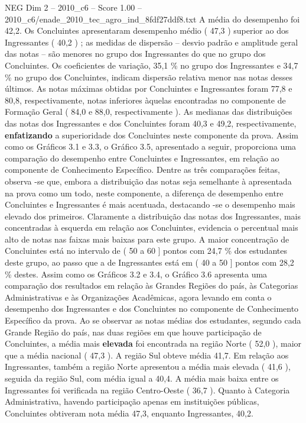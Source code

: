 \begin{textsample}{NEG Dim 2 – 2010\_c6 – Score 1.00 – 2010\_c6/enade\_2010\_tec\_agro\_ind\_8fdf27ddf8.txt}
A média do desempenho foi 42,2.
Os Concluintes apresentaram desempenho médio ( 47,3 ) superior ao dos Ingressantes ( 40,2 ) ; as medidas de dispersão – desvio padrão e amplitude geral das notas – são menores no grupo dos Ingressantes do que no grupo dos Concluintes.
Os coeficientes de variação, 35,1 \% no grupo dos Ingressantes e 34,7 \% no grupo dos Concluintes, indicam dispersão relativa menor nas notas desses últimos.
As notas máximas obtidas por Concluintes e Ingressantes foram 77,8 e 80,8, respectivamente, notas inferiores àquelas encontradas no componente de Formação Geral ( 84,0 e 88,0, respectivamente ).
As medianas das distribuições das notas dos Ingressantes e dos Concluintes foram 40,3 e 49,2, respectivamente, \textbf{enfatizando} a superioridade dos Concluintes neste componente da prova.
Assim como os Gráficos 3.1 e 3.3, o Gráfico 3.5, apresentado a seguir, proporciona uma comparação do desempenho entre Concluintes e Ingressantes, em relação ao componente de Conhecimento Específico.
Dentre as três comparações feitas, observa -se que, embora a distribuição das notas seja semelhante à apresentada na prova como um todo, neste componente, a diferença de desempenho entre Concluintes e Ingressantes é mais acentuada, destacando -se o desempenho mais elevado dos primeiros.
Claramente a distribuição das notas dos Ingressantes, mais concentradas à esquerda em relação aos Concluintes, evidencia o percentual mais alto de notas nas faixas mais baixas para este grupo.
A maior concentração de Concluintes está no intervalo de ( 50 a 60 ] pontos com 24,7 \% dos estudantes deste grupo, ao passo que a de Ingressantes está em ( 40 a 50 ] pontos com 28,2 \% destes.
Assim como os Gráficos 3.2 e 3.4, o Gráfico 3.6 apresenta uma comparação dos resultados em relação às Grandes Regiões do país, às Categorias Administrativas e às Organizações Acadêmicas, agora levando em conta o desempenho dos Ingressantes e dos Concluintes no componente de Conhecimento Específico da prova.
Ao se observar as notas médias dos estudantes, segundo cada Grande Região do país, nas duas regiões em que houve participação de Concluintes, a média mais \textbf{elevada} foi encontrada na região Norte ( 52,0 ), maior que a média nacional ( 47,3 ).
A região Sul obteve média 41,7.
Em relação aos Ingressantes, também a região Norte apresentou a média mais elevada ( 41,6 ), seguida da região Sul, com média igual a 40,4.
A média mais baixa entre os Ingressantes foi verificada na região Centro-Oeste ( 36,7 ).
Quanto à Categoria Administrativa, havendo participação apenas em instituições públicas, Concluintes obtiveram nota média 47,3, enquanto Ingressantes, 40,2.

\end{textsample}
